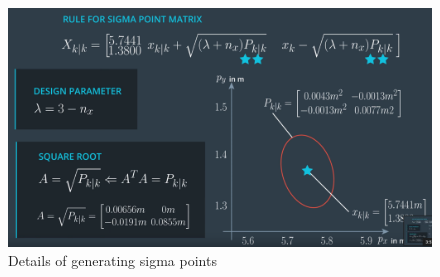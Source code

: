\documentclass[a4paper,12pt]{article}
\begin{document}
\begin{figure}[h!]
  \caption{Details of generating sigma points}
  \centering
    \includegraphics[scale=.15]{8.png}
\end{figure}
\end{document}
